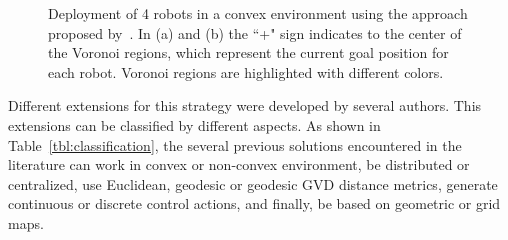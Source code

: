 \documentclass[twocolumn]{svjour3}       %
\begin{document}
\begin{figure}[b]
\centering
{} 
\caption{Deployment of 4 robots in a convex environment using the approach proposed by~\cite{Cortes2004}. In (a) and (b) the ``+" sign indicates to the center of the Voronoi regions, which represent the current goal position for each robot. Voronoi regions are highlighted with different colors.}
\label{fig:sampledeplyoment}
\end{figure}

Different extensions for this strategy were developed by several authors. This extensions can be classified by different aspects.
As shown in Table~\ref{tbl:classification}, the several previous solutions encountered in the literature can work in convex or non-convex environment, be distributed or centralized, use Euclidean, geodesic or geodesic GVD distance metrics, generate continuous or discrete control actions, and finally, be based on geometric or grid maps. 
\end{document}
